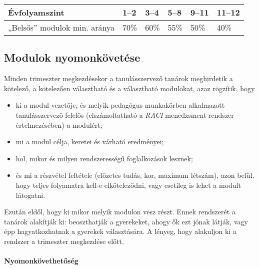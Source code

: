 
\begin{longtable}[]{@{}llllll@{}}
\toprule
Évfolyamszint & 1--2 & 3--4 & 5--8 & 9--11 & 11--12\tabularnewline
\midrule
\endhead
„Belsős'' modulok min. aránya & 70\% & 60\% & 55\% & 50\% &
40\%\tabularnewline
\bottomrule
\end{longtable}

\hypertarget{modulok-nyomonkovetese}{%
\subsection{Modulok nyomonkövetése}\label{modulok-nyomonkovetese}}

Minden trimeszter megkezdésekor a tanulásszervező tanárok meghirdetik a
kötelező, a kötelezően választható és a választható modulokat, azaz
rögzítik, hogy

\begin{itemize}
\item
  ki a modul vezetője, és melyik pedagógus munkakörben alkalmazott
  tanulásszervező felelős (elszámoltatható a
  {\emph{RACI}}
  menedzsment
  rendszer értelmezésében) a modulért;
\item
  mi a modul célja, keretei és várható eredményei;
\item
  hol, mikor és milyen rendszerességű foglalkozások lesznek;
\item
  és mi a részvétel feltétele (előzetes tudás, kor, maximum létszám),
  azon belül, hogy teljes folyamatra kell-e
  elköteleződni, vagy esetileg is lehet a modult látogatni.
\end{itemize}

Ezután eldől, hogy ki mikor melyik modulon vesz részt. Ennek rendszerét
a tanárok alakítják ki: beoszthatják a gyerekeket, ahogy ők ezt jónak
látják, vagy épp hagyatkozhatnak a gyerekek választására. A lényeg, hogy
alakuljon ki a rendszer a trimeszter megkezdése előtt.

\hypertarget{nyomonkovethetoseg}{%
\paragraph{Nyomonkövethetőség}\label{nyomonkovethetoseg}}

